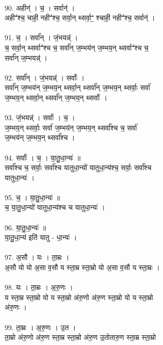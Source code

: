 \\
90. अहीन्॑ । च॒ । सर्वान्॑ ।\\
अहीꣲ॑श्च॒ चाही॒ नहीꣲ॑श्च॒ सर्वा॒न् थ्सर्वा॒ꣲ॒ श्चाही॒ नहीꣲ॑श्च॒ सर्वान्॑ ।\\
\\
91. च॒ । सर्वा᳚न् । जं॒भयन्न्॑ ।\\
च॒ सर्वा॒न् थ्सर्वाꣲ॑श्च च॒ सर्वा᳚न् ज॒म्भय॑न् ज॒म्भय॒न् थ्सर्वाꣲ॑श्च च॒\\
सर्वा᳚न् ज॒म्भयन्न्॑ ।\\
\\
92. सर्वा᳚न् । जं॒भयन्न्॑ । सर्वाः᳚ ।\\
सर्वा᳚न् ज॒म्भय॑न् ज॒म्भय॒न् थ्सर्वा॒न् थ्सर्वा᳚न् ज॒म्भय॒न् थ्सर्वाः॒ सर्वा॑\\
ज॒म्भय॒न् थ्सर्वा॒न् थ्सर्वा᳚न् ज॒म्भय॒न् थ्सर्वाः᳚ ।\\
\\
93. जं॒भयन्न्॑ । सर्वाः᳚ । च॒ ।\\
ज॒म्भय॒न् थ्सर्वाः॒ सर्वा॑ ज॒म्भय॑न् ज॒म्भय॒न् थ्सर्वा᳚श्च च॒ सर्वा॑\\
ज॒म्भय॑न् ज॒म्भय॒न् थ्सर्वा᳚श्च ।\\
\\
94. सर्वाः᳚ । च॒ । या॒तु॒धा॒न्यः॑ ॥\\
सर्वा᳚श्च च॒ सर्वाः॒ सर्वा᳚श्च यातुधा॒न्यो॑ यातुधा॒न्य॑श्च॒ सर्वाः॒ सर्वा᳚श्च\\
यातुधा॒न्यः॑ ।\\
\\
95. च॒ । या॒तु॒धा॒न्यः॑ ॥\\
च॒ या॒तु॒धा॒न्यो॑ यातुधा॒न्य॑श्च च यातुधा॒न्यः॑ ।\\
\\
96. या॒तु॒धा॒न्यः॑ ॥\\
या॒तु॒धा॒न्य॑ इति॑ यातु - धा॒न्यः॑ ।\\
\\
97. अ॒सौ । यः । ता॒म्रः ।\\
अ॒सौ यो यो अ॒सा व॒सौ य स्ता॒म्र स्ता॒म्रो यो अ॒सा व॒सौ य स्ता॒म्रः ।\\
\\
98. यः । ता॒म्रः । अ॒रु॒णः ।\\
य स्ता॒म्र स्ता॒म्रो यो य स्ता॒म्रो अ॑रु॒णो अ॑रु॒ण स्ता॒म्रो यो य स्ता॒म्रो\\
अ॑रु॒णः ।\\
\\
99. ता॒म्रः । अ॒रु॒णः । उ॒त ।\\
ता॒म्रो अ॑रु॒णो अ॑रु॒ण स्ता॒म्र स्ता॒म्रो अ॑रु॒ण उ॒तोतारु॒ण स्ता॒म्र स्ता॒म्रो\\
